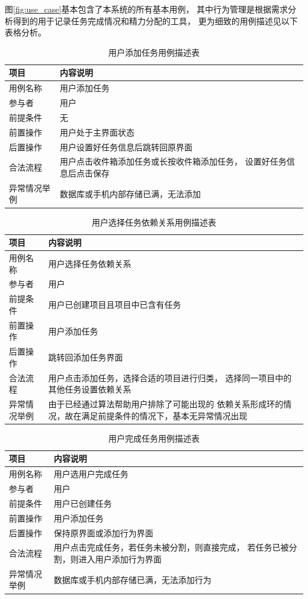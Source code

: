 图\ref{fig:use_case}基本包含了本系统的所有基本用例，
其中行为管理是根据需求分析得到的用于记录任务完成情况和精力分配的工具，
更为细致的用例描述见以下表格分析。

\begin{table}[H]
	\centering
	\caption{用户添加任务用例描述表}
	\begin{tabular}{l|p{8cm}} \toprule
	  项目 & 内容说明 \\
	  \midrule
	  用例名称 & 用户添加任务 \\
	  参与者 & 用户 \\
	  前提条件 & 无 \\
	  前置操作 & 用户处于主界面状态 \\
	  后置操作 & 用户设置好任务信息后跳转回原界面 \\
	  合法流程 & 用户点击收件箱添加任务或长按收件箱添加任务，
	  设置好任务信息后点击保存 \\
	  异常情况举例 & 数据库或手机内部存储已满，无法添加 \\
	  \bottomrule
	\end{tabular}
\end{table}

\begin{table}[H]
	\centering
	\caption{用户选择任务依赖关系用例描述表}
	\begin{tabular}{l|p{8cm}} \toprule
	  项目 & 内容说明 \\
	  \midrule
	  用例名称 & 用户选择任务依赖关系 \\
	  参与者 & 用户 \\
	  前提条件 & 用户已创建项目且项目中已含有任务 \\
	  前置操作 & 用户添加任务 \\
	  后置操作 & 跳转回添加任务界面 \\
	  合法流程 & 用户点击添加任务，选择合适的项目进行归类，
	  选择同一项目中的其他任务设置依赖关系 \\
	  异常情况举例 & 由于已经通过算法帮助用户排除了可能出现的
	  依赖关系形成环的情况，故在满足前提条件的情况下，基本无异常情况出现 \\
	  \bottomrule
	\end{tabular}
\end{table}

\begin{table}[H]
	\centering
	\caption{用户完成任务用例描述表}
	\begin{tabular}{l|p{8cm}} \toprule
	  项目 & 内容说明 \\
	  \midrule
	  用例名称 & 用户选用户完成任务 \\
	  参与者 & 用户 \\
	  前提条件 & 用户已创建任务 \\
	  前置操作 & 用户添加任务 \\
	  后置操作 & 保持原界面或添加行为界面 \\
	  合法流程 & 用户点击完成任务，若任务未被分割，则直接完成，
	  若任务已被分割，则进入用户添加行为界面 \\
	  异常情况举例 & 数据库或手机内部存储已满，无法添加行为 \\
	  \bottomrule
	\end{tabular}
\end{table}


